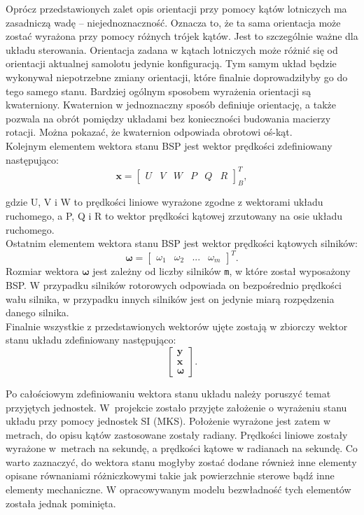 Oprócz przedstawionych zalet opis orientacji przy pomocy kątów lotniczych ma zasadniczą wadę -- niejednoznaczność. Oznacza to, że ta sama orientacja może zostać wyrażona przy pomocy różnych trójek kątów. Jest to szczególnie ważne dla układu sterowania. Orientacja zadana w kątach lotniczych może różnić się od orientacji aktualnej samolotu jedynie konfiguracją. Tym samym układ będzie wykonywał niepotrzebne zmiany orientacji, które finalnie doprowadziłyby go do tego samego stanu. Bardziej ogólnym sposobem wyrażenia orientacji są kwaterniony. Kwaternion w jednoznaczny sposób definiuje orientację, a także pozwala na obrót pomiędzy układami bez konieczności budowania macierzy rotacji. Można pokazać, że kwaternion odpowiada obrotowi oś-kąt.\\

Kolejnym elementem wektora stanu BSP jest wektor prędkości zdefiniowany następująco:
\[
	\bm{x} = \begin{bmatrix}U & V & W &  P & Q & R  \end{bmatrix}^{T}_{B},
 \]
 
 gdzie U, V i W to prędkości liniowe wyrażone zgodne z wektorami układu ruchomego, a P, Q i R to wektor prędkości kątowej zrzutowany na osie układu ruchomego.\\
 
 Ostatnim elementem wektora stanu BSP jest wektor prędkości kątowych silników:
 \[
	\bm{\omega} = \begin{bmatrix}\omega_1 & \omega_2 & ... &  \omega_{m}  \end{bmatrix}^{T}.
 \]
 Rozmiar wektora $\bm{\omega}$ jest zależny od liczby silników \texttt{m}, w które został wyposażony BSP. W przypadku silników rotorowych odpowiada on bezpośrednio prędkości wału silnika, w przypadku innych silników jest on jedynie miarą rozpędzenia danego silnika.\\
 
Finalnie wszystkie z przedstawionych wektorów ujęte zostają w zbiorczy wektor stanu układu zdefiniowany następująco:
\[
      	\begin{bmatrix} \bm{y}\\ \bm{x} \\  \bm{\omega} \end{bmatrix}.
\]

Po całościowym zdefiniowaniu wektora stanu układu należy poruszyć temat przyjętych jednostek. W~projekcie zostało przyjęte założenie o wyrażeniu stanu układu przy pomocy jednostek SI (MKS). Położenie wyrażone jest zatem w metrach, do opisu kątów zastosowane zostały radiany. Prędkości liniowe zostały wyrażone w~metrach na sekundę, a prędkości kątowe w radianach na sekundę.
Co warto zaznaczyć, do wektora stanu mogłyby zostać dodane również inne elementy opisane równaniami różniczkowymi takie jak powierzchnie sterowe bądź inne elementy mechaniczne. W opracowywanym modelu bezwładność tych elementów została jednak pominięta.

